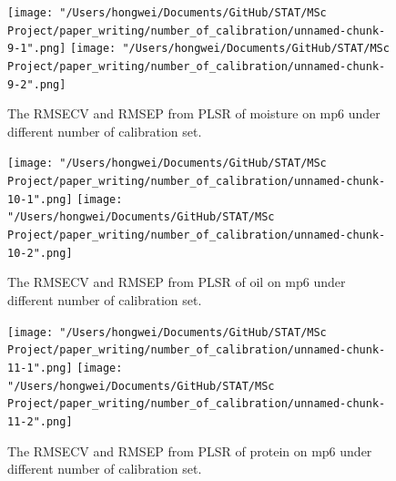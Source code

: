 \documentclass[a4paper,12pt,titlepage]{article} %
\numberwithin{equation}{section}  %
\begin{document}
\begin{appendices}
			\begin{figure}[h]    %
	\centering           %
	\texttt{[image: "/Users/hongwei/Documents/GitHub/STAT/MSc Project/paper\_writing/number\_of\_calibration/unnamed-chunk-9-1".png]}  %
	\texttt{[image: "/Users/hongwei/Documents/GitHub/STAT/MSc Project/paper\_writing/number\_of\_calibration/unnamed-chunk-9-2".png]}  %
	\caption{The RMSECV and RMSEP from PLSR of moisture on mp6 under different number of calibration set.}          %
	\label{fig:calibration_9-1}               %
\end{figure}                        %


			\begin{figure}[h]    %
	\centering           %
	\texttt{[image: "/Users/hongwei/Documents/GitHub/STAT/MSc Project/paper\_writing/number\_of\_calibration/unnamed-chunk-10-1".png]}  %
	\texttt{[image: "/Users/hongwei/Documents/GitHub/STAT/MSc Project/paper\_writing/number\_of\_calibration/unnamed-chunk-10-2".png]}  %
	\caption{The RMSECV and RMSEP from PLSR of oil on mp6 under different number of calibration set.}          %
	\label{fig:calibration_10-1}               %
\end{figure}                        %



			\begin{figure}[h]    %
	\centering           %
	\texttt{[image: "/Users/hongwei/Documents/GitHub/STAT/MSc Project/paper\_writing/number\_of\_calibration/unnamed-chunk-11-1".png]}  %
	\texttt{[image: "/Users/hongwei/Documents/GitHub/STAT/MSc Project/paper\_writing/number\_of\_calibration/unnamed-chunk-11-2".png]}  %
	\caption{The RMSECV and RMSEP from PLSR of protein on mp6 under different number of calibration set.}          %
	\label{fig:calibration_11-1}               %
\end{figure}                        %



\end{appendices}
\end{document}
